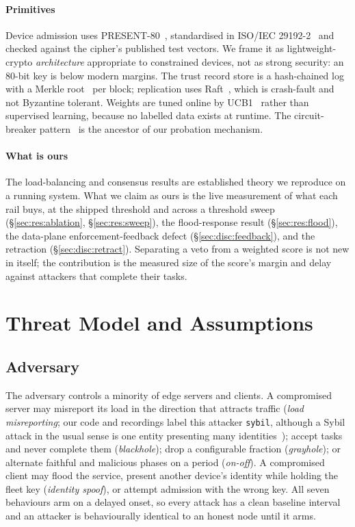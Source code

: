 \documentclass[10pt,twocolumn,letterpaper]{article}
\begin{document}
\paragraph*{Primitives}
Device admission uses PRESENT-80~\cite{bogdanov2007present}, standardised in
ISO/IEC 29192-2~\cite{iso29192} and checked against the cipher's published test
vectors. We frame it as lightweight-crypto \emph{architecture} appropriate to
constrained devices, not as strong security: an 80-bit key is below modern
margins. The trust record store is a hash-chained log with a Merkle
root~\cite{merkle1988signature} per block; replication uses
Raft~\cite{ongaro2014raft}, which is crash-fault and not Byzantine tolerant.
Weights are tuned online by UCB1~\cite{auer2002ucb1} rather than supervised
learning, because no labelled data exists at runtime. The circuit-breaker
pattern~\cite{nygard2018releaseit} is the ancestor of our probation mechanism.

\paragraph*{What is ours}
The load-balancing and consensus results are established theory we reproduce on
a running system. What we claim as ours is the live measurement of what each rail buys, at the
shipped threshold and across a threshold sweep (\S\ref{sec:res:ablation},
\S\ref{sec:res:sweep}), the flood-response result (\S\ref{sec:res:flood}),
the data-plane enforcement-feedback defect (\S\ref{sec:disc:feedback}), and the
retraction (\S\ref{sec:disc:retract}). Separating a veto from a weighted score
is not new in itself; the contribution is the measured size of the score's
margin and delay against attackers that complete their tasks.

\section{Threat Model and Assumptions}
\label{sec:threat}

\subsection{Adversary}
The adversary controls a minority of edge servers and clients. A compromised
server may misreport its load in the direction that attracts traffic
(\emph{load misreporting}; our code and recordings label this attacker
\texttt{sybil}, although a Sybil attack in the usual sense is one entity
presenting many identities~\cite{douceur2002sybil}); accept tasks and never complete them
(\emph{blackhole}); drop a configurable fraction (\emph{grayhole}); or
alternate faithful and malicious phases on a period (\emph{on-off}). A
compromised client may flood the service, present another device's identity
while holding the fleet key (\emph{identity spoof}), or attempt admission with
the wrong key. All seven behaviours arm on a delayed onset, so every attack has
a clean baseline interval and an attacker is behaviourally identical to an
honest node until it arms.
\end{document}
